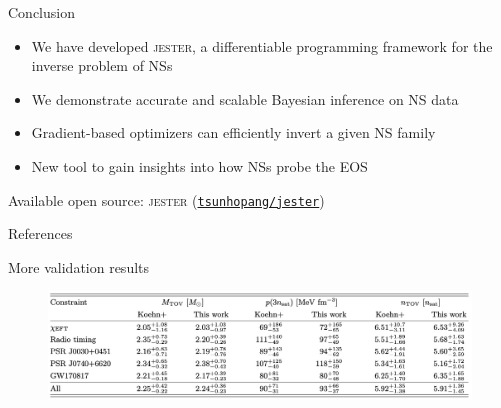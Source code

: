 \documentclass[usenames,dvipsnames,t]{beamer}
\begin{document}
\begin{frame}{Conclusion}

  \def\x{5mm}
  \def\y{7mm}

  \begin{itemize}
    \item We have developed \textsc{jester}, a differentiable programming framework for the inverse problem of NSs

    \vspace{\x}

    \item We demonstrate accurate and scalable Bayesian inference on NS data

    \vspace{\x}

    \item Gradient-based optimizers can efficiently invert a given NS family

    \vspace{\x}

    \item New tool to gain insights into how NSs probe the EOS
  \end{itemize}

  \vspace{\y}

  Available open source: \textsc{jester} (\href{https://github.com/tsunhopang/jester}{{\faGithub \texttt{tsunhopang/jester}}})
\end{frame}

\begin{frame}[allowframebreaks]{References}
  \printbibliography
\end{frame}

\begin{frame}{More validation results}


  \begin{figure}
    \centering
    \includegraphics[width=\linewidth]{Figures/Untitled.jpg}
  \end{figure}
\end{frame}
\end{document}
